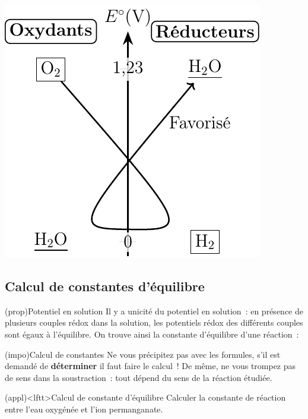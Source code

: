 \documentclass[../../main/main.tex]{subfiles}
\begin{document}
\begin{tcb*}
\begin{isd}
\begin{center}
{      }{
      \includegraphics[width=.6\linewidth]{estand_mediamut-h2o}
      }
    \end{center}
  \end{isd}
\end{tcb*}

\subsection{Calcul de constantes d'équilibre}
\begin{tcb*}(prop){Potentiel en solution}
 Il y a unicité du potentiel en solution~: en présence de plusieurs couples
 rédox dans la solution, les potentiels rédox des différents couples sont égaux
 à l'équilibre. On trouve ainsi la constante d'équilibre d'une réaction~:
 \psw{
   \[
     \ce{Ox_1 + Red_2 = Red_1 + Ox_2}
     \Ra 
     K = \frac{a_{\ce{Red_1}} a_{\ce{Ox_2}}}{a_{\ce{Ox_1}} a_{\ce{Red_2}}}
     \Lra
     \boxed{K = 10^{\frac{n}{\num{0.06}}(E_1^\circ - E_2^\circ)}}
   \]
 }
\end{tcb*}

\begin{tcb*}(impo){Calcul de constantes}
  Ne vous précipitez pas avec les formules, s'il est demandé de
  \textbf{déterminer} il faut faire le calcul~! De même, ne vous trompez pas de
  sens dans la soustraction~: tout dépend du sens de la réaction étudiée.
\end{tcb*}

\begin{tcb*}(appl)<lftt>{Calcul de constante d'équilibre}
    Calculer la constante de réaction entre l'eau oxygénée et l'ion
    permanganate.
    \tcblower
\end{tcb*}
\end{document}
